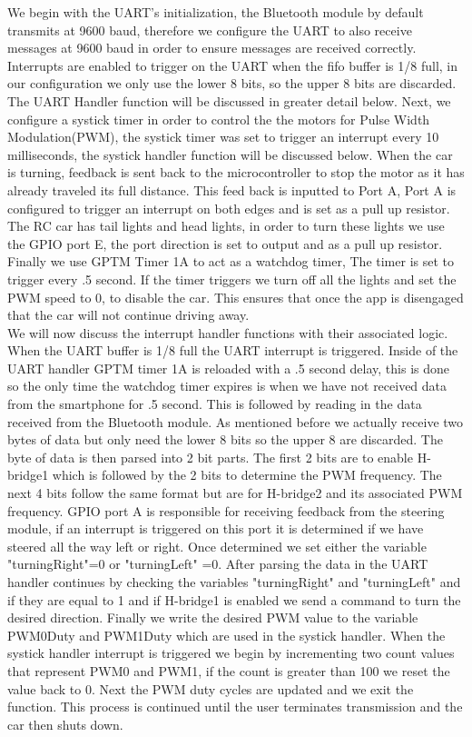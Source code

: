 \documentclass[12pt]{article}
\begin{document}
We begin with the UART's initialization, the Bluetooth module by default transmits at 9600 baud, therefore we configure the UART to also receive messages at 9600 baud in order to ensure messages are received correctly. Interrupts are enabled to trigger on the UART when the fifo buffer is 1/8 full, in our configuration we only use the lower 8 bits, so the upper 8 bits are discarded. The UART Handler function will be discussed in greater detail below. Next, we configure a systick timer in order to control the   the motors for Pulse Width Modulation(PWM), the systick timer was set to trigger an interrupt every 10 milliseconds, the systick handler function will be discussed below. When the car is turning, feedback is sent back to the microcontroller to stop the motor as it has already traveled its full distance. This feed back is inputted to Port A, Port A is configured to trigger an interrupt on both edges and is set as a pull up resistor. The RC car has tail lights and head lights, in order to turn these lights we use the GPIO port E, the port direction is set to output and as a pull up resistor. Finally we use GPTM Timer 1A to act as a watchdog timer, The timer is set to trigger every .5 second. If the timer triggers we turn off all the lights and set the PWM speed to 0, to disable the car. This ensures that once the app is disengaged that the car will not continue driving away.\\

We will now discuss the interrupt handler functions with their associated logic. When the UART buffer is 1/8 full the UART interrupt is triggered. Inside of the UART handler GPTM timer 1A is reloaded with a .5 second delay, this is done so the only time the watchdog timer expires is when we have not received data from the smartphone for .5 second. This is followed by reading in the data received from the Bluetooth module. As mentioned before we actually receive two bytes of data but only need the lower 8 bits so the upper 8 are discarded. The byte of data is then parsed into 2 bit parts. The first 2 bits are to enable H-bridge1 which is followed by the 2 bits to determine the PWM frequency. The next 4 bits follow the same format but are for H-bridge2 and its associated PWM frequency. GPIO port A is responsible for receiving feedback from the steering module, if an interrupt is triggered on this port it is determined if we have steered all the way left or right. Once determined we set either the variable "turningRight"=0 or "turningLeft" =0. After parsing the data in the UART handler continues by checking the variables "turningRight" and "turningLeft" and if they are equal to 1 and if H-bridge1 is enabled we send a command to turn the desired direction. Finally we write the desired PWM value to the variable PWM0Duty and PWM1Duty which are used in the systick handler. When the systick handler interrupt is triggered we begin by incrementing two count values that represent PWM0 and PWM1, if the count is greater than 100 we reset the value back to 0. Next the PWM duty cycles are updated and we exit the function. This process is continued until the user terminates transmission and the car then shuts down.  
\end{document}
